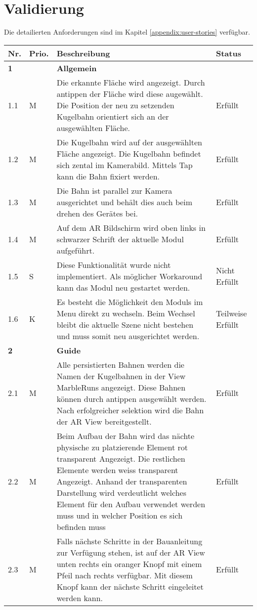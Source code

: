 \section{Validierung}

Die detailierten Anforderungen sind im Kapitel \ref{appendix:user-stories} verfügbar.

\begin{longtable}{l l p{10cm} l}
	\hline
	\textbf{Nr.} & \textbf{Prio.} & \textbf{Beschreibung} & \textbf{Status} \\
	\hline
	\textbf{1} & & \textbf{Allgemein} & \\
	\hline
	1.1 & M & Die erkannte Fläche wird angezeigt. Durch antippen der Fläche wird diese augewählt. Die Position der neu zu setzenden Kugelbahn orientiert sich an der ausgewählten Fläche. & Erfüllt \\
	1.2 & M & Die Kugelbahn wird auf der ausgewählten Fläche angezeigt. Die Kugelbahn befindet sich zental im Kamerabild. Mittels Tap kann die Bahn fixiert werden. & Erfüllt \\
	1.3 & M & Die Bahn ist parallel zur Kamera ausgerichtet und behält dies auch beim drehen des Gerätes bei. & Erfüllt \\
	1.4 & M & Auf dem AR Bildschirm wird oben links in schwarzer Schrift der aktuelle Modul aufgeführt. & Erfüllt \\
	1.5 & S & Diese Funktionalität wurde nicht implementiert. Als möglicher Workaround kann das Modul neu gestartet werden. & Nicht Erfüllt \\
	1.6 & K & Es besteht die Möglichkeit den Moduls im Menu direkt zu wechseln. Beim Wechsel bleibt die aktuelle Szene nicht bestehen und muss somit neu ausgerichtet werden. & Teilweise Erfüllt \\
	\hline
	\textbf{2} & & \textbf{Guide} & \\
	\hline
	2.1 & M & Alle persistierten Bahnen werden die Namen der Kugelbahnen in der View MarbleRuns angezeigt. Diese Bahnen können durch antippen ausgewählt werden. Nach erfolgreicher selektion wird die Bahn der AR View bereitgestellt. & Erfüllt \\
	2.2 & M & Beim Aufbau der Bahn wird das nächte physische zu platzierende Element rot transparent Angezeigt. Die restlichen Elemente werden weiss transparent Angezeigt. Anhand der transparenten Darstellung wird verdeutlicht welches Element für den Aufbau verwendet werden muss und in welcher Position es sich befinden muss  & Erfüllt \\
	2.3 & M & Falls nächste Schritte in der Bauanleitung zur Verfügung stehen, ist auf der AR View unten rechts ein oranger Knopf mit einem Pfeil nach rechts verfügbar. Mit diesem Knopf kann der nächste Schritt eingeleitet werden kann. & Erfüllt \\

\end{longtable}
